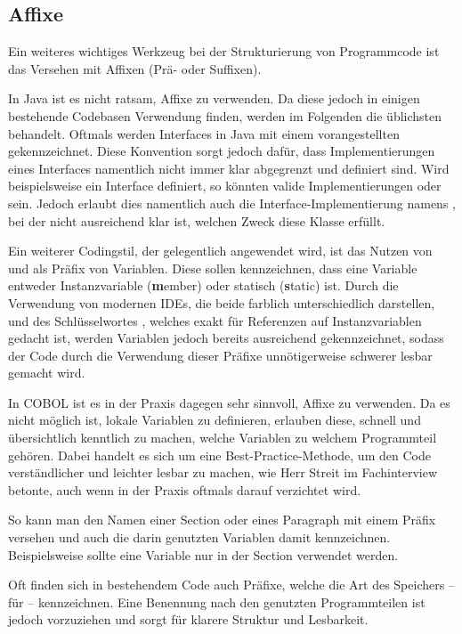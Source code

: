 \subsection*{Affixe} \label{affix}\label{affixCOBOL}
Ein weiteres wichtiges Werkzeug bei der Strukturierung von Programmcode ist das Versehen mit Affixen (Prä- oder Suffixen).

In Java ist es nicht ratsam, Affixe zu verwenden. Da diese jedoch in einigen bestehende Codebasen Verwendung finden, werden im Folgenden die üblichsten behandelt.
Oftmals werden Interfaces in Java mit einem vorangestellten  gekennzeichnet. Diese Konvention sorgt jedoch dafür, dass Implementierungen eines Interfaces namentlich nicht immer klar abgegrenzt und definiert sind. Wird beispielsweise ein Interface  definiert, so könnten valide Implementierungen  oder  sein. Jedoch erlaubt dies namentlich auch die Interface-Implementierung namens , bei der nicht ausreichend klar ist, welchen Zweck diese Klasse erfüllt.

Ein weiterer Codingstil, der gelegentlich angewendet wird, ist das Nutzen von  und  als Präfix von Variablen. Diese sollen kennzeichnen, dass eine Variable entweder Instanzvariable (\textbf{m}ember) oder statisch (\textbf{s}tatic) ist. Durch die Verwendung von modernen IDEs, die beide farblich unterschiedlich darstellen, und des Schlüsselwortes , welches exakt für Referenzen auf Instanzvariablen gedacht ist, werden Variablen jedoch bereits ausreichend gekennzeichnet, sodass der Code durch die Verwendung dieser Präfixe unnötigerweise schwerer lesbar gemacht wird.

In COBOL ist es in der Praxis dagegen sehr sinnvoll, Affixe zu verwenden. Da es nicht möglich ist, lokale Variablen zu definieren, erlauben diese, schnell und übersichtlich kenntlich zu machen, welche Variablen zu welchem Programmteil gehören. Dabei handelt es sich um eine Best-Practice-Methode, um den Code verständlicher und leichter lesbar zu machen, wie Herr Streit im Fachinterview betonte, auch wenn in der Praxis oftmals darauf verzichtet wird.

So kann man den Namen einer Section oder eines Paragraph mit einem Präfix versehen und auch die darin genutzten Variablen damit kennzeichnen. Beispielsweise sollte eine Variable  nur in der Section  verwendet werden. 

Oft finden sich in bestehendem Code auch Präfixe, welche die Art des Speichers -- \zB {} für  -- kennzeichnen. Eine Benennung nach den genutzten Programmteilen ist jedoch vorzuziehen und sorgt für klarere Struktur und Lesbarkeit.


